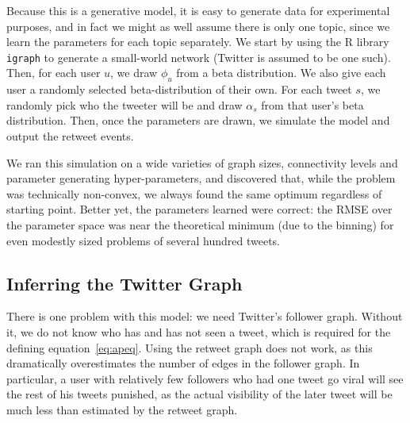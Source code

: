 Because this is a generative model, it is easy to generate data for experimental purposes, and in fact we might as well assume there is only one topic, since we learn the parameters for each topic separately.  
We start by using the R library \texttt{igraph} to generate a small-world network (Twitter is assumed to be one such).
Then, for each user $u$, we draw $\phi_u$ from a beta distribution.  
We also give each user a randomly selected beta-distribution of their own.  
For each tweet $s$, we randomly pick who the tweeter will be and draw $\alpha_s$ from that user's beta distribution.  
Then, once the parameters are drawn, we simulate the model and output the retweet events.

We ran this simulation on a wide varieties of graph sizes, connectivity levels and parameter generating hyper-parameters, and discovered that, while the problem was technically non-convex, we always found the same optimum regardless of starting point.  
Better yet, the parameters learned were correct: the RMSE over the parameter space was near the theoretical minimum (due to the binning) for even modestly sized problems of several hundred tweets.  

\subsection{Inferring the Twitter Graph}

There is one problem with this model: we need Twitter's follower graph.
Without it, we do not know who has and has not seen a tweet, which is required for the defining equation~\eqref{eq:apeq}.  
Using the retweet graph does not work, as this dramatically overestimates the number of edges in the follower graph.
In particular, a user with relatively few followers who had one tweet go viral will see the rest of his tweets punished, as the actual visibility of the later tweet will be much less than estimated by the retweet graph.  

